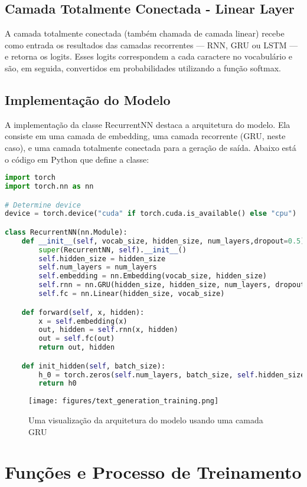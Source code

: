 \documentclass[a4paper,12pt]{article}
\begin{document}
\subsection{Camada Totalmente Conectada - Linear Layer}
A camada totalmente conectada (também chamada de camada linear) recebe como entrada os resultados das camadas recorrentes — RNN, GRU ou LSTM — e retorna os logits. Esses logits correspondem a cada caractere no vocabulário e são, em seguida, convertidos em probabilidades utilizando a função softmax.

\subsection{Implementação do Modelo}

A implementação da classe RecurrentNN destaca a arquitetura do modelo. Ela consiste em uma camada de embedding, uma camada recorrente (GRU, neste caso), e uma camada totalmente conectada para a geração de saída. Abaixo está o código em Python que define a classe:
\begin{lstlisting}[language=Python,breaklines]
import torch
import torch.nn as nn

# Determine device
device = torch.device("cuda" if torch.cuda.is_available() else "cpu")

class RecurrentNN(nn.Module):
    def __init__(self, vocab_size, hidden_size, num_layers,dropout=0.5):
        super(RecurrentNN, self).__init__()
        self.hidden_size = hidden_size
        self.num_layers = num_layers
        self.embedding = nn.Embedding(vocab_size, hidden_size)
        self.rnn = nn.GRU(hidden_size, hidden_size, num_layers, dropout=dropout, batch_first=True)
        self.fc = nn.Linear(hidden_size, vocab_size)

    def forward(self, x, hidden):
        x = self.embedding(x)
        out, hidden = self.rnn(x, hidden)
        out = self.fc(out)
        return out, hidden

    def init_hidden(self, batch_size):
        h_0 = torch.zeros(self.num_layers, batch_size, self.hidden_size).to(device)
        return h0
\end{lstlisting}

\begin{figure}[h!]
   \centering
   \caption{Uma visualização da arquitetura do modelo usando uma camada GRU}
   \texttt{[image: figures/text\_generation\_training.png]}
\end{figure}

\section{Funções e Processo de Treinamento}
\end{document}
